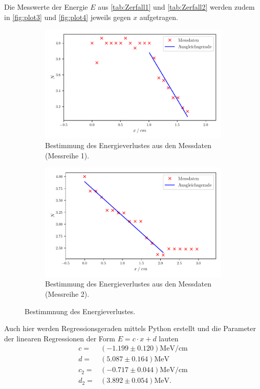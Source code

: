 Die Messwerte der Energie $E$ aus \autoref{tab:Zerfall1} und \autoref{tab:Zerfall2} werden zudem in \autoref{fig:plot3} und \autoref{fig:plot4}
jeweils gegen $x$ aufgetragen.

\begin{figure}[H]
  \begin{subfigure}{\textwidth}
  \centering
  \includegraphics[scale=0.75]{build/plot3.pdf}
  \caption {Bestimmung des Energieverlustes aus den Messdaten (Messreihe 1).}
  \label{fig:plot3}
\end{subfigure}
\hfill
\begin{subfigure}
  \centering
  \includegraphics[scale=0.75]{build/plot4.pdf}
  \caption {Bestimmung des Energieverlustes aus den Messdaten (Messreihe 2).}
  \label{fig:plot4}
\end{subfigure}
\caption{Bestimmnung des Energieverlustes.}
\end{figure}

Auch hier werden Regressionsgeraden mittels Python erstellt und die Parameter der linearen Regressionen der Form
$E=c \cdot x +d $ lauten
\begin{align*}
  c =& (-1.199 \pm  0.120)\si{\mega\eV\per\centi\meter}\\
  d =& (5.087 \pm 0.164) \si{\mega\eV}\\
  c_2 =& (-0.717 \pm  0.044)\si{\mega\eV\per\centi\meter}\\
  d_2 =& (3.892 \pm 0.054) \si{\mega\eV}.
\end{align*}

